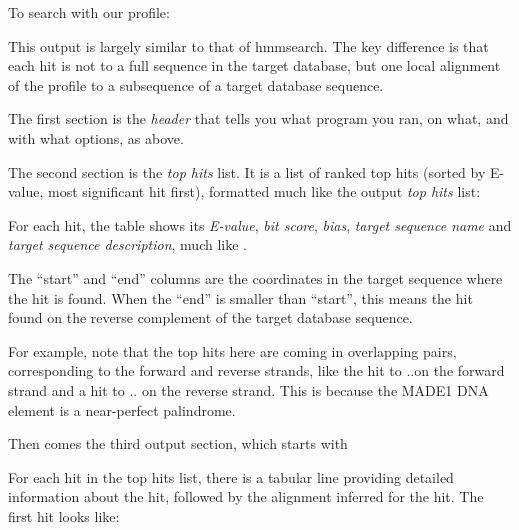 To search  with our  profile:

   \vspace{1ex}
   \vspace{1ex}

This output is largely similar to that of hmmsearch. The key
difference is that each hit is not to a full sequence in the target
database, but one local alignment of the profile to a subsequence of a
target database sequence.

The first section is the \emph{header} that tells you what program you
ran, on what, and with what options, as above.

The second section is the \emph{top hits} list. It is a list
of ranked top hits (sorted by E-value, most significant hit first),
formatted much like the  output \emph{top hits} list:


For each hit, the table shows its \emph{E-value}, \emph{bit score},
\emph{bias}, \emph{target sequence name} and \emph{target sequence
  description}, much like .

The ``start'' and ``end'' columns are the coordinates in the target
sequence where the hit is found. When the ``end'' is smaller than
``start'', this means the hit found on the reverse complement of the
target database sequence.

For example, note that the top hits here are coming in overlapping
pairs, corresponding to the forward and reverse strands, like the hit
to \NMHafrom{}..\NMHato on the forward strand and a hit to
\NMHbfrom{}..\NMHbto{} on the reverse strand. This is because the
MADE1 DNA element is a near-perfect palindrome.

Then comes the third output section, which starts with


For each hit in the top hits list, there is a tabular line
providing detailed information about the hit, followed by the alignment
inferred for the hit. The first  hit
looks like: 

